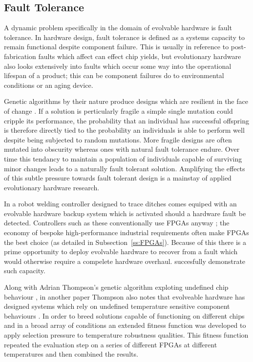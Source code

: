 \subsection{Fault Tolerance}

A dynamic problem specifically in the domain of evolvable hardware is fault
tolerance.
In hardware design, fault tolerance is defined as a systems capacity to
remain functional despite component failure. This is usually in reference to
post-fabrication faults which affect can effect chip yields, but evolutionary
hardware also looks extensively into faults which occur some way into the
operational lifespan of a product; this can be component failures do to environmental
conditions or an aging device.

Genetic algorithms by their nature produce designs which are resilient in the face
of change \cite{10.1007/3-540-46406-9_14}\cite{651463}. If a solution is perticularly fragile a
simple single mutation could cripple its performance, the probability that an individual
has successful offspring is therefore directly tied to the probability an individuals is
able to perform well
despite being subjected to random mutations. More fragile designs are often
mutated into obscurity whereas ones with
natural fault tolerance endure. Over time this tendancy to maintain a population
of individuals capable of surviving minor changes leads to a naturally fault tolerant
solution.
Amplifying the effects of this subtle pressure towards fault
tolerant design is a mainstay of applied evolutionary hardware research.

In \cite{10.1007/3-540-61093-6_6} a robot welding controller designed to trace
ditches comes equiped with an evolvable hardware backup system which is activated
should a hardware fault be detected. Controllers such as these conventionally use
FPGAs anyway \cite{4267891}; the economy of bespoke high-performance industrial requirements
often make FPGAs the best choice (as detailed in Subsection~\ref{ss:FPGAs}). Because of
this there is a prime opportunity to deploy evolvable hardware to recover from
a fault which would otherwise require a compelete hardware overhaul. \cite{10.1007/3-540-61093-6_6}
succesfully demonstrate such capacity.

Along with Adrian Thompson's genetic algorithm exploting undefined chip behaviour
\cite{10.1007/3-540-63173-9_61}, in another paper Thompson also notes that evolveable
hardware has designed
systems which rely on undefined temperature sensitive component behaviours
\cite{Thompson:1998:ADR:645508.656773}. In order to breed solutions capable
of functioning on different chips and in a broad array of conditions an extended
fitness function
was developed to apply selection pressure to temperature robustness qualities.
This fitness function repeated the evaluation step on a series of different FPGAs
at different temperatures and then combined the results.

